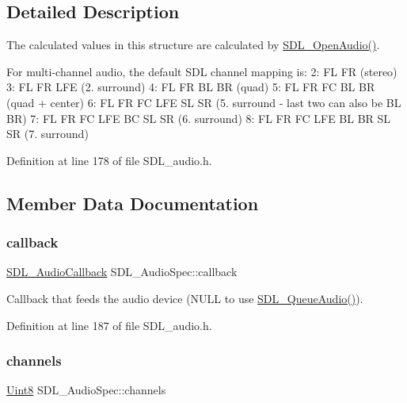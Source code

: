 \subsection{Detailed Description}
The calculated values in this structure are calculated by \mbox{\hyperlink{_s_d_l__audio_8h_a2edf30e7747584e28041b4986f89f440}{S\+D\+L\+\_\+\+Open\+Audio()}}.

For multi-\/channel audio, the default S\+DL channel mapping is\+: 2\+: FL FR (stereo) 3\+: FL FR L\+FE (2. surround) 4\+: FL FR BL BR (quad) 5\+: FL FR FC BL BR (quad + center) 6\+: FL FR FC L\+FE SL SR (5. surround -\/ last two can also be BL BR) 7\+: FL FR FC L\+FE BC SL SR (6. surround) 8\+: FL FR FC L\+FE BL BR SL SR (7. surround) 

Definition at line 178 of file S\+D\+L\+\_\+audio.\+h.



\subsection{Member Data Documentation}
\mbox{\label{struct_s_d_l___audio_spec_a1f8d05139f1679dcf359f49251233eac}} 
\subsubsection{\texorpdfstring{callback}{callback}}
{\footnotesize\ttfamily \mbox{\hyperlink{_s_d_l__audio_8h_a379fcc25845e46bfa80cb3619fc2821c}{S\+D\+L\+\_\+\+Audio\+Callback}} S\+D\+L\+\_\+\+Audio\+Spec\+::callback}

Callback that feeds the audio device (N\+U\+LL to use \mbox{\hyperlink{_s_d_l__audio_8h_a19ef6fa2396f581aaf4d9a9512972268}{S\+D\+L\+\_\+\+Queue\+Audio()}}). 

Definition at line 187 of file S\+D\+L\+\_\+audio.\+h.

\mbox{\label{struct_s_d_l___audio_spec_a31fe8b3710cf23bbef24be8a1749fe46}} 
\subsubsection{\texorpdfstring{channels}{channels}}
{\footnotesize\ttfamily \mbox{\hyperlink{_s_d_l__stdinc_8h_a2944638813a090aa23e62f4da842c3e2}{Uint8}} S\+D\+L\+\_\+\+Audio\+Spec\+::channels}

